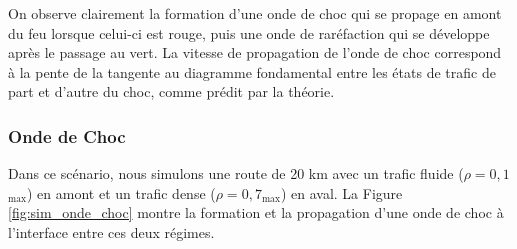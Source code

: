 On observe clairement la formation d'une onde de choc qui se propage en amont du feu lorsque celui-ci est rouge, puis une onde de raréfaction qui se développe après le passage au vert. La vitesse de propagation de l'onde de choc correspond à la pente de la tangente au diagramme fondamental entre les états de trafic de part et d'autre du choc, comme prédit par la théorie.

\subsubsection{Onde de Choc}
\label{subsubsec:onde_choc_sim}

Dans ce scénario, nous simulons une route de 20 km avec un trafic fluide ($\rho = 0,1$\rho$_{\max}$) en amont et un trafic dense ($\rho = 0,7$\rho$_{\max}$) en aval. La Figure \ref{fig:sim_onde_choc} montre la formation et la propagation d'une onde de choc à l'interface entre ces deux régimes.


